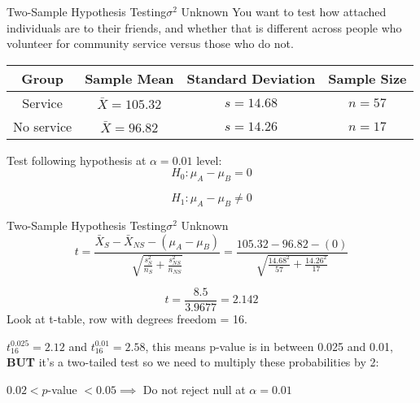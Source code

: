 \documentclass{beamer}
\begin{document}
\begin{frame}{Two-Sample Hypothesis Testing}{$\sigma^2$ Unknown}
	You want to test how attached individuals are to their friends, and whether that is different across people who volunteer for community service versus those who do not.

	\begin{center}
		\begin{tabular}{|c|c|c|c|}
			\hline
			\textbf{Group} & \textbf{Sample Mean}  & \textbf{Standard Deviation} & \textbf{Sample Size} \\
			\hline
			Service & $\bar{X} = 105.32$ & $s = 14.68$ & $n = 57$ \\
			\hline
			No service & $\bar{X} = 96.82$ & $s = 14.26$ & $n = 17$ \\
			\hline
		\end{tabular}
	\end{center}

	Test following hypothesis at $\alpha=0.01$ level:
	\[ 
		H_0: \mu_A - \mu_B = 0
	\]

	\[ 
		H_1: \mu_A - \mu_B \neq 0
	\]
\end{frame}

\begin{frame}{Two-Sample Hypothesis Testing}{$\sigma^2$ Unknown}
	\[ 
		t = \frac{\bar{X}_S-\bar{X}_{NS} - (\mu_A - \mu_B)}{\sqrt{\frac{s^2_S}{n_S} + \frac{s^2_{NS}}{n_{NS}}}} = \frac{105.32-96.82-(0)}{\sqrt{\frac{14.68^2}{57}+\frac{14.26^2}{17}}}
	\]

	\[ 
		t = \frac{8.5}{3.9677} = 2.142
	\]
	Look at t-table, row with degrees freedom = 16. 
	
	$t_{16}^{0.025} = 2.12$ and $t_{16}^{0.01} = 2.58$, this means p-value is in between 0.025 and 0.01, \textbf{BUT} it's a two-tailed test so we need to multiply these probabilities by 2:
	
	$0.02 < p$-value $< 0.05 \implies$ Do not reject null at $\alpha = 0.01$
\end{frame}
\end{document}
